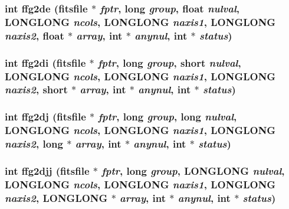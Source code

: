 \subsubsection{\setlength{\rightskip}{0pt plus 5cm}int ffg2de (\bf{fitsfile} $\ast$ {\em fptr}, long {\em group}, float {\em nulval}, \bf{LONGLONG} {\em ncols}, \bf{LONGLONG} {\em naxis1}, \bf{LONGLONG} {\em naxis2}, float $\ast$ {\em array}, int $\ast$ {\em anynul}, int $\ast$ {\em status})}\label{src_2fitsio_8h_36629153f5fd51962111d41048969a40}


\subsubsection{\setlength{\rightskip}{0pt plus 5cm}int ffg2di (\bf{fitsfile} $\ast$ {\em fptr}, long {\em group}, short {\em nulval}, \bf{LONGLONG} {\em ncols}, \bf{LONGLONG} {\em naxis1}, \bf{LONGLONG} {\em naxis2}, short $\ast$ {\em array}, int $\ast$ {\em anynul}, int $\ast$ {\em status})}\label{src_2fitsio_8h_da4f58ff230b3af721108debfe6f714c}


\subsubsection{\setlength{\rightskip}{0pt plus 5cm}int ffg2dj (\bf{fitsfile} $\ast$ {\em fptr}, long {\em group}, long {\em nulval}, \bf{LONGLONG} {\em ncols}, \bf{LONGLONG} {\em naxis1}, \bf{LONGLONG} {\em naxis2}, long $\ast$ {\em array}, int $\ast$ {\em anynul}, int $\ast$ {\em status})}\label{src_2fitsio_8h_d70a66cf5f02755193c64133ebff878d}


\subsubsection{\setlength{\rightskip}{0pt plus 5cm}int ffg2djj (\bf{fitsfile} $\ast$ {\em fptr}, long {\em group}, \bf{LONGLONG} {\em nulval}, \bf{LONGLONG} {\em ncols}, \bf{LONGLONG} {\em naxis1}, \bf{LONGLONG} {\em naxis2}, \bf{LONGLONG} $\ast$ {\em array}, int $\ast$ {\em anynul}, int $\ast$ {\em status})}\label{src_2fitsio_8h_b46c21e9a851140bf03249f872c2d376}


